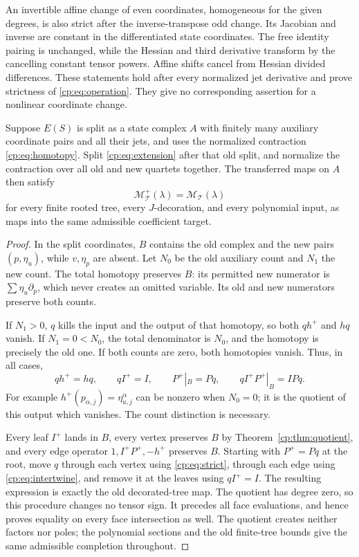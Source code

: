 An invertible affine change of even coordinates, homogeneous for
the given degrees, is also strict after the inverse-transpose odd
change.  Its Jacobian and inverse are constant in the differentiated
state coordinates.  The free identity pairing is unchanged, while
the Hessian and third derivative transform by the cancelling
constant tensor powers.  Affine shifts cancel from Hessian
divided differences.  These statements hold after every normalized
jet derivative and prove strictness of \eqref{cp:eq:operation}.
They give no corresponding assertion for a nonlinear coordinate
change.

\begin{theorem}
\label{cp:thm:transfer}
Suppose \(E(S)\) is split as a state complex \(A\) with finitely
many auxiliary coordinate pairs and all their jets, and uses the normalized contraction
\eqref{cp:eq:homotopy}.  Split \eqref{cp:eq:extension} after that
old split, and normalize the contraction over all old and new
quartets together.  The transferred maps on \(A\) then satisfy
\[
 \mathcal M^+_{\mathcal T}(\lambda)
       =\mathcal M_{\mathcal T}(\lambda)
\]
for every finite rooted tree, every \(J\)-decoration, and every
polynomial input, as maps into the same admissible coefficient target.
\end{theorem}

\begin{proof}
In the split coordinates, \(B\) contains the old complex and the
new pairs \((p,\eta_u)\), while \(v,\eta_p\) are absent.
Let \(N_0\) be the old auxiliary count and \(N_1\) the new count.
The total homotopy preserves \(B\): its permitted new numerator
is \(\sum\eta_u\partial_p\), which never creates an omitted
variable.  Its old and new numerators preserve both counts.

If \(N_1>0\), \(q\) kills the input and the output of that
homotopy, so both \(qh^+\) and \(hq\) vanish.
If \(N_1=0<N_0\), the total denominator is \(N_0\), and
the homotopy is precisely the old one.  If both counts are zero,
both homotopies vanish.  Thus, in all cases,
\begin{equation}\label{cp:eq:intertwine}
 qh^+=hq,\qquad qI^+=I,\qquad P^+|_B=Pq,\qquad
 qI^+P^+|_B=IPq.
\end{equation}
For example \(h^+(p_{\alpha,j})=\eta_{u,j}^\alpha\) can be
nonzero when \(N_0=0\); it is the quotient of this output which
vanishes.  The count distinction is necessary.

Every leaf \(I^+\) lands in \(B\), every vertex preserves \(B\)
by Theorem~\ref{cp:thm:quotient}, and every edge operator
\(1,I^+P^+,-h^+\) preserves \(B\).  Starting with
\(P^+=Pq\) at the root, move \(q\) through each vertex using
\eqref{cp:eq:strict}, through each edge using
\eqref{cp:eq:intertwine}, and remove it at the leaves using
\(qI^+=I\).  The resulting expression is exactly the old
decorated-tree map.  The quotient has degree zero, so this
procedure changes no tensor sign.  It precedes all face evaluations,
and hence proves equality on every face intersection as well.
The quotient creates neither factors nor poles; the polynomial
sections and the old finite-tree bounds give the same admissible
completion throughout.
\end{proof}

